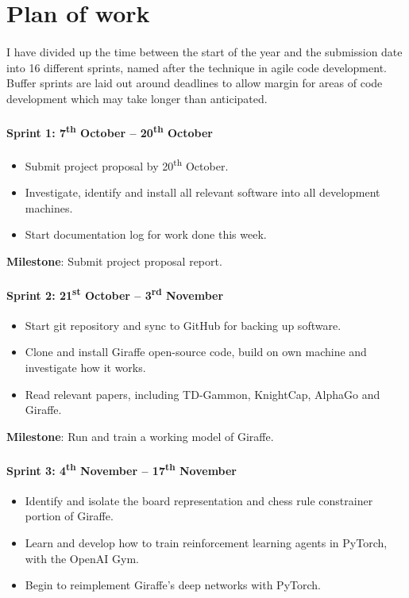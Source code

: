 \documentclass[a4paper]{article}
\begin{document}
\section*{Plan of work}

\paragraph{} I have divided up the time between the start of the year and the submission date into 16 different sprints, named after the technique in agile code development. Buffer sprints are laid out around deadlines to allow margin for areas of code development which may take longer than anticipated.

\paragraph{Sprint 1: 7\textsuperscript{th} October -- 20\textsuperscript{th} October}
\begin{itemize}
\item Submit project proposal by 20\textsuperscript{th} October.
\item Investigate, identify and install all relevant software into all development machines.
\item Start documentation log for work done this week.
\end{itemize}

\textbf{Milestone}: Submit project proposal report.

\paragraph{Sprint 2: 21\textsuperscript{st} October -- 3\textsuperscript{rd} November}
\begin{itemize}
\item Start git repository and sync to GitHub for backing up software.
\item Clone and install Giraffe open-source code, build on own machine and investigate how it works.
\item Read relevant papers, including TD-Gammon, KnightCap, AlphaGo and Giraffe. 
\end{itemize}

\textbf{Milestone}: Run and train a working model of Giraffe.

\paragraph{Sprint 3: 4\textsuperscript{th} November -- 17\textsuperscript{th} November}
\begin{itemize}
\item Identify and isolate the board representation and chess rule constrainer portion of Giraffe.
\item Learn and develop how to train reinforcement learning agents in PyTorch, with the OpenAI Gym.
\item Begin to reimplement Giraffe's deep networks with PyTorch.
\end{itemize}
\end{document}
